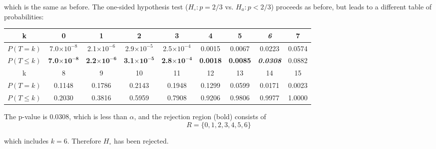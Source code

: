 which is the same as before. The one-sided hypothesis test ($H_\circ:
p={2/3}$ vs. $H_a: p<2/3$) proceeds as before, but leads to a
different table of probabilities:
\begin{center}
  \begin{tabular}{c@{\gap}c@{\gap}c@{\gap}c@{\gap}c@{\gap}c@{\gap}c@{\gap}c@{\gap}c}
    k & \textbf{0} & \textbf{1} & \textbf{2} & \textbf{3} & \textbf{4} & \textbf{5} & \textbf{\textit{6}} & 7 \\ \hline
    $P(T=k)$ & 7.0$\times{10}^{-8}$ & 2.1$\times{10}^{-6}$ & 2.9$\times{10}^{-5}$ & 2.5$\times{10}^{-4}$ & 0.0015 & 0.0067 & 0.0223 & 0.0574 \\
    $P({T}\leq{k})$ & \textbf{7.0}$\mathbf{\times{10}^{-8}}$ & \textbf{2.2}$\mathbf{\times{10}^{-6}}$ & \textbf{3.1}$\mathbf{\times{10}^{-5}}$ &
    \textbf{2.8}$\mathbf{\times{10}^{-4}}$ & \textbf{0.0018} & \textbf{0.0085} & \textbf{\textit{0.0308}} & 0.0882 \\
    k & 8 & 9 & 10 & 11 & 12 & 13 & 14 & 15 \\ \hline
    $P(T=k)$ & 0.1148 & 0.1786 & 0.2143 & 0.1948 & 0.1299 & 0.0599 & 0.0171 & 0.0023 \\
    $P({T}\leq{k})$ & 0.2030 & 0.3816 & 0.5959 & 0.7908 & 0.9206 & 0.9806 & 0.9977 & 1.0000 \\
  \end{tabular}
\end{center}

The p-value is 0.0308, which is less than $\alpha$, and the rejection
region (bold) consists of
\begin{equation}
  R=\{0,1,2,3,4,5,6\}
  \label{eq:1sidedbinomtest15}
\end{equation}

\noindent which includes $k=6$. Therefore $H_\circ$ has been rejected.

